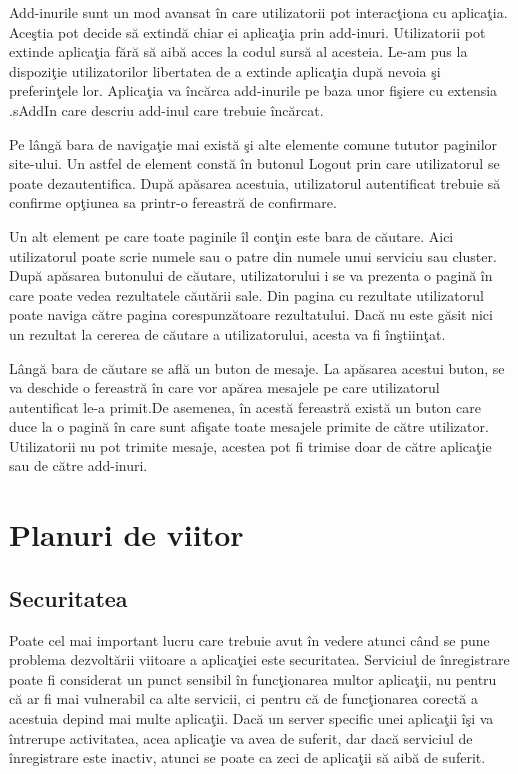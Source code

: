 \documentclass[a4paper,12pt]{report}
\begin{document}
Add-inurile sunt un mod avansat \^in care utilizatorii pot interac\c tiona cu aplica\c tia. Ace\c stia 
pot decide s\u a extind\u a chiar ei aplica\c tia prin add-inuri. Utilizatorii pot extinde aplica\c tia 
f\u ar\u a s\u a aib\u a acces la codul surs\u a al acesteia. Le-am pus la dispozi\c tie utilizatorilor libertatea de a extinde 
aplica\c tia dup\u a nevoia \c si preferin\c tele lor. Aplica\c tia va \^inc\u arca add-inurile pe baza unor 
fi\c siere cu extensia .sAddIn care descriu add-inul care trebuie \^inc\u arcat.

Pe l\^ang\u a bara de naviga\c tie mai exist\u a \c si alte elemente comune 
tututor paginilor site-ului. Un astfel de element const\u a \^in butonul Logout 
prin care utilizatorul se poate dezautentifica. Dup\u a ap\u asarea acestuia, 
utilizatorul autentificat trebuie s\u a confirme op\c tiunea sa printr-o 
fereastr\u a de confirmare.

Un alt element pe care toate paginile \^il con\c tin este bara de c\u autare.
Aici utilizatorul poate scrie numele sau o patre din numele unui serviciu sau cluster.
Dup\u a ap\u asarea butonului de c\u autare, utilizatorului i se va prezenta o pagin\u a 
\^in care poate vedea rezultatele c\u aut\u arii sale. Din pagina cu rezultate 
utilizatorul poate naviga c\u atre pagina corespunz\u atoare rezultatului.
Dac\u a nu este g\u asit nici un rezultat la cererea de c\u autare a utilizatorului,
acesta va fi \^in\c stiin\c tat.

L\^ang\u a bara de c\u autare se afl\u a un buton de mesaje. La ap\u asarea acestui buton,
se va deschide o fereastr\u a \^in care vor ap\u area mesajele pe care utilizatorul 
autentificat le-a primit.De asemenea, \^in acest\u a fereastr\u a exist\u a un buton care 
duce la o pagin\u a \^in care sunt afi\c sate toate mesajele primite de c\u atre utilizator.
Utilizatorii nu pot trimite mesaje, acestea pot fi trimise doar de c\u atre aplica\c tie sau de 
c\u atre add-inuri.

\chapter{Planuri de viitor}

\section{Securitatea}

Poate cel mai important lucru care trebuie avut \^in vedere atunci c\^and se pune problema  
dezvolt\u arii viitoare a aplica\c tiei este securitatea. Serviciul de \^inregistrare 
poate fi considerat un punct sensibil \^in func\c tionarea multor aplica\c tii, nu pentru c\u a 
ar fi mai vulnerabil ca alte servicii, ci pentru c\u a de func\c tionarea corect\u a a acestuia 
depind mai multe aplica\c tii. Dac\u a un server specific unei aplica\c tii \^i\c si va \^intrerupe 
activitatea, acea aplica\c tie va avea de suferit, dar dac\u a serviciul de \^inregistrare este inactiv, 
atunci se poate ca zeci de aplica\c tii s\u a aib\u a de suferit. 
\end{document}

